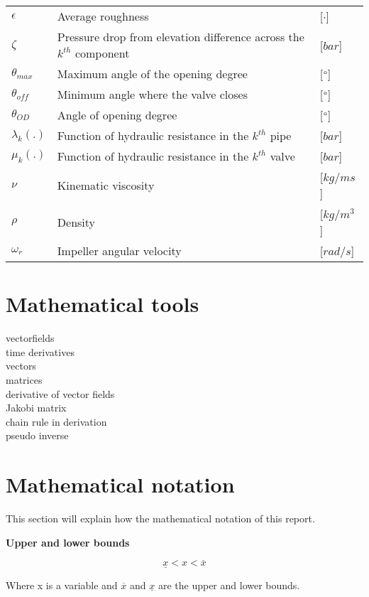 \begin{tabular}{l l l}
	$\epsilon$		&	Average roughness									     	& [$\cdot$]\\
	$\zeta$			&	Pressure drop from elevation difference across the $k^{th}$ component	& [$bar$]\\
	$\theta_{max}$	&	Maximum angle of the opening degree						    & [$\degree$]\\
	$\theta_{off}$	&	Minimum angle where the valve closes						& [$\degree$]\\
	$\theta_{OD}$	&	Angle of opening degree										& [$\degree$]\\
	$\lambda_k(.)$	&	Function of hydraulic resistance in the $k^{th}$ pipe		& [$bar$]\\
	$\mu_k(.)$		&	Function of hydraulic resistance in the $k^{th}$ valve		& [$bar$]\\
	$\nu$			&	Kinematic viscosity									     	& [$kg/ms$]\\
	$\rho$			&	Density									     				& [$kg/m^3$]\\
	$\omega_r$		&	Impeller angular velocity									& [$rad/s$]\\
	
\end{tabular}

\section*{Mathematical tools}
vectorfields
\\
time derivatives
\\
vectors
\\
matrices
\\
derivative of vector fields
\\
Jakobi matrix
\\
chain rule in derivation
\\
pseudo inverse



\section*{Mathematical notation}

This section will explain how the mathematical notation of this report. 

\textbf{Upper and lower bounds}




\begin{equation}
\underline{x} < x < \overline{x}
\end{equation}

 Where x is a variable and $\overline{x}$ and $\underline{x}$ are the upper and lower bounds.

